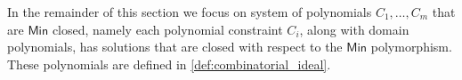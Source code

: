 \documentclass[11pt]{article}
\newcommand{\Cc}{\mathcal{C}}
\newcommand{\CSP}{\textsc{CSP}}
\newcommand{\IMP}{\textsc{IMP}}
\newcommand{\Max}{\textsf{Max}}
\newcommand{\Min}{\textsf{Min}}
\newcommand{\Majority}{\textsf{Majority}}
\newcommand{\Minority}{\textsf{Minority }}
\newcommand{\I}{\emph{$\rm{I}$}}
\newcommand{\1}{\textbf{1}}
\newcommand{\GB}{\text{Gr\"{o}bner} }
\newtheorem{theorem}{Theorem}[section]
\newtheorem{corollary}[theorem]{Corollary}
\begin{document}
% 


In the remainder of this section we focus on system of polynomials $C_1,\ldots, C_m$ that are $\Min$ closed, namely each polynomial constraint $C_i$, along with domain polynomials, has solutions that are closed with respect to the $\Min$ polymorphism. These polynomials are defined in \cref{def:combinatorial_ideal}.
\end{document}
